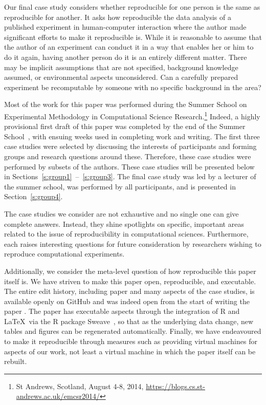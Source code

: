 Our final case study considers whether reproducible for one person is the same
as reproducible for another. It asks how reproducible the data analysis of a
published experiment in human-computer interaction where the author made
significant efforts to make it reproducible is. While it is reasonable to assume
that the author of an experiment can conduct it in a way that enables her or him
to do it again, having another person do it is an entirely different matter.
There may be implicit assumptions that are not specified, background knowledge
assumed, or environmental aspects unconsidered. Can a carefully prepared
experiment be recomputable by someone with no specific background in the area?

Most of the work for this paper was performed during the Summer School on
Experimental Methodology in Computational Science Research.\footnote{St
Andrews, Scotland, August 4-8, 2014,
\url{https://blogs.cs.st-andrews.ac.uk/emcsr2014/}}
Indeed, a highly
provisional first draft of this paper was completed by the end of the Summer
School~\cite{emcsr_arxiv_draft}, with ensuing weeks used in completing work and writing.  
The first three case studies
were selected by discussing the interests of participants and forming groups
and research questions around these. Therefore, these case studies were
performed by subsets of the authors. These case studies will be
presented below in Sections~\ref{s:group1}~--~\ref{s:group3}. The final case
study was led by a lecturer of the summer school, was performed by all
participants, and is presented in Section~\ref{s:group4}.

The case studies we consider are not exhaustive and no single one can give
complete answers. Instead, they shine spotlights on specific, important areas
related to the issue of reproducibility in computational sciences. Furthermore,
each raises interesting questions for future consideration by researchers
wishing to reproduce computational experiments.

Additionally, we consider the meta-level question of how reproducible this paper
itself is.  We have striven to make this paper open, reproducible, and
executable.
The entire edit history, including paper and many aspects of the
case studies, is available openly on
GitHub
and was indeed open from the start
of writing the paper  
\cite{summerschoolpaper}.
The paper has executable aspects through the integration of R
and \LaTeX\ via the R package Sweave~\cite{pineda-krch:sweave}, so that as the underlying
data change, new tables and figures can be regenerated automatically. Finally,
we have endeavoured to make it reproducible through measures such as providing
virtual machines for aspects of our work, not least a virtual machine in which
the paper itself can be rebuilt.
